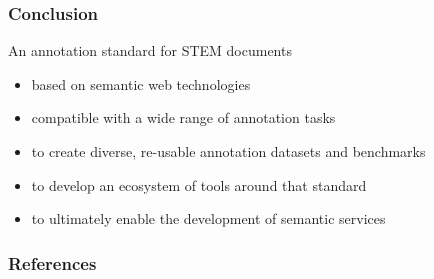 \documentclass[aspectratio=169]{beamer}
\begin{document}
\begin{frame}
    \frametitle{Conclusion}
    An annotation standard for STEM documents
    \begin{itemize}
        \item based on semantic web technologies
        \item compatible with a wide range of annotation tasks
        \item to create diverse, re-usable annotation datasets and benchmarks
        \item to develop an ecosystem of tools around that standard
        \item to ultimately enable the development of semantic services
    \end{itemize}
\end{frame}

\appendix   %

\begin{frame}[allowframebreaks,t]
    \frametitle{References}
    \printbibliography
\end{frame}
\end{document}
